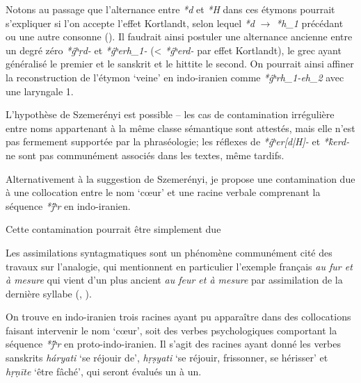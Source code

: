 \documentclass{article}
\newcommand{\ipa}[1]{{\phon\textit{#1}}}
\begin{document}
Notons au passage que l'alternance entre \ipa{*d} et \ipa{*H} dans ces étymons pourrait s'expliquer si l'on accepte l'effet Kortlandt, selon lequel \ipa{*d} $\rightarrow$ \ipa{*h_1} précédant ou une autre consonne (\citealt{kortlandt83numerals, garnier14kortlandt}). Il faudrait ainsi postuler une alternance ancienne entre un degré zéro \ipa{*ĝʰṛd-} et  \ipa{*ĝʰerh_1-} (< \ipa{*ĝʰerd-} par effet Kortlandt), le grec ayant généralisé le premier et le sanskrit et le hittite le second. On pourrait ainsi affiner la reconstruction de l'étymon `veine' en indo-iranien comme \ipa{*ĝʰrh_1-eh_2} avec une laryngale 1.

L'hypothèse de Szemerényi est possible -- les cas de contamination irrégulière entre noms appartenant à la même classe sémantique sont attestés, mais elle n'est pas fermement supportée par la phraséologie; les réflexes de \ipa{*ĝʰer[d|H]-} et \ipa{*k̂erd-} ne sont pas communément associés dans les textes, même tardifs.

Alternativement à la suggestion de Szemerényi, je propose une contamination due à une collocation entre le nom `cœur' et une racine verbale comprenant la séquence \ipa{*j́ʰr} en indo-iranien. 

Cette contamination pourrait être simplement due

\citealt[III, 485]{vasmer55russisches}

Les assimilations syntagmatiques sont un phénomène communément cité des travaux sur l'analogie, qui mentionnent en particulier l'exemple français \ipa{au fur et à mesure} qui vient d'un plus ancient \ipa{au feur et à mesure} par assimilation de la dernière syllabe (\citealt[16]{andersen80morpho}, \citealt[64]{fertig13analogy}). %

On trouve en indo-iranien trois racines ayant pu apparaître dans des collocations faisant intervenir le nom `cœur', soit des verbes psychologiques comportant la séquence \ipa{*j́ʰr} en proto-indo-iranien. Il s'agit des racines ayant donné les verbes sanskrits \ipa{háryati} `se réjouir de', \ipa{hṛṣyati} `se réjouir, frissonner, se hérisser' et \ipa{hṛṇīte} `être fâché', qui seront évalués un à un.
\end{document}
